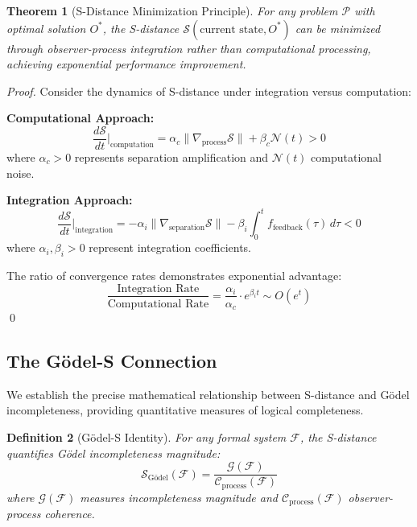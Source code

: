 \documentclass[12pt,a4paper]{article}
\newtheorem{theorem}{Theorem}[section]
\newtheorem{definition}[theorem]{Definition}
\begin{document}
\begin{theorem}[S-Distance Minimization Principle]
For any problem $\mathcal{P}$ with optimal solution $O^*$, the S-distance $\mathcal{S}(\text{current state}, O^*)$ can be minimized through observer-process integration rather than computational processing, achieving exponential performance improvement.
\end{theorem}

\begin{proof}
Consider the dynamics of S-distance under integration versus computation:

\textbf{Computational Approach:}
\begin{equation}
\frac{d\mathcal{S}}{dt}\bigg|_{\text{computation}} = \alpha_c \|\nabla_{\text{process}} \mathcal{S}\| + \beta_c \mathcal{N}(t) > 0
\end{equation}
where $\alpha_c > 0$ represents separation amplification and $\mathcal{N}(t)$ computational noise.

\textbf{Integration Approach:}
\begin{equation}
\frac{d\mathcal{S}}{dt}\bigg|_{\text{integration}} = -\alpha_i \|\nabla_{\text{separation}} \mathcal{S}\| - \beta_i \int_0^t f_{\text{feedback}}(\tau) \, d\tau < 0
\end{equation}
where $\alpha_i, \beta_i > 0$ represent integration coefficients.

The ratio of convergence rates demonstrates exponential advantage:
\begin{equation}
\frac{\text{Integration Rate}}{\text{Computational Rate}} = \frac{\alpha_i}{\alpha_c} \cdot e^{\beta_i t} \sim O(e^t)
\end{equation}
\qed
\end{proof}

\subsection{The Gödel-S Connection}

We establish the precise mathematical relationship between S-distance and Gödel incompleteness, providing quantitative measures of logical completeness.

\begin{definition}[Gödel-S Identity]
For any formal system $\mathcal{F}$, the S-distance quantifies Gödel incompleteness magnitude:
\begin{equation}
\mathcal{S}_{\text{Gödel}}(\mathcal{F}) = \frac{\mathcal{G}(\mathcal{F})}{\mathcal{C}_{\text{process}}(\mathcal{F})}
\end{equation}
where $\mathcal{G}(\mathcal{F})$ measures incompleteness magnitude and $\mathcal{C}_{\text{process}}(\mathcal{F})$ observer-process coherence.
\end{definition}
\end{document}
